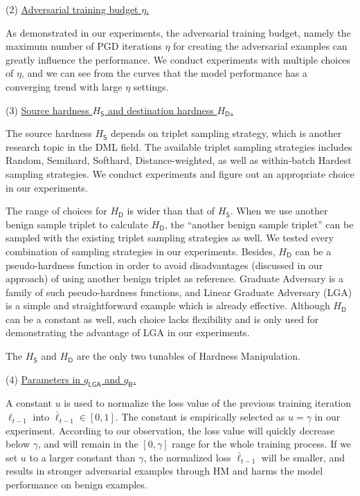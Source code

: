 (2) \ul{Adversarial training budget $\eta$.}

As demonstrated in our experiments, the adversarial training budget, namely the
maximum number of PGD iterations $\eta$ for creating the adversarial examples
can greatly influence the performance.
%
We conduct experiments with multiple choices of $\eta$, and we can see from the
curves that the model performance has a converging trend with large $\eta$
settings.

(3) \ul{Source hardness $H_\mathsf{S}$ and destination hardness
$H_\mathsf{D}$.}

The source hardness $H_\mathsf{S}$ depends on triplet sampling strategy, which
is another research topic in the DML field.
%
The available triplet sampling strategies includes Random, Semihard, Softhard,
Distance-weighted, as well as within-batch Hardest sampling strategies.
%
We conduct experiments and figure out an appropriate choice in our experiments.

The range of choices for $H_\mathsf{D}$ is wider than that of $H_\mathsf{S}$.
%
When we use another benign sample triplet to calculate $H_\mathsf{D}$, the
``another benign sample triplet'' can be sampled with the existing triplet
sampling strategies as well.
%
We tested every combination of sampling strategies in our experiments.
%
Besides, $H_\mathsf{D}$ can be a pseudo-hardness function in order to avoid
disadvantages (discussed in our approach) of using another benign triplet as
reference.
%
Graduate Adversary is a family of such pseudo-hardness functions, and Linear
Graduate Adversary (LGA) is a simple and straightforward example which is
already effective.
%
Although $H_\mathsf{D}$ can be a constant as well, such choice lacks
flexibility and is only used for demonstrating the advantage of LGA in our
experiments.

The $H_\mathsf{S}$ and $H_\mathsf{D}$ are the only two tunables of Hardness
Manipulation.

(4) \ul{Parameters in $g_\mathsf{LGA}$ and $g_\mathsf{B}$.}

A constant $u$ is used to normalize the loss value of the previous training
iteration $\ell_{t-1}$ into $\bar{\ell}_{t-1}\in[0,1]$.
%
The constant is empirically selected as $u=\gamma$ in our experiment.
%
According to our observation, the loss value will quickly decrease below
$\gamma$, and will remain in the $[0,\gamma]$ range for the whole training
process.
%
If we set $u$ to a larger constant than $\gamma$, the normalized loss
$\bar{\ell}_{t-1}$ will be smaller, and results in stronger adversarial
examples through HM and harms the model performance on benign examples.

